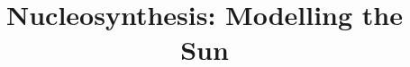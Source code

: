 \documentclass[conference]{IEEEtran}
\title{Nucleosynthesis: Modelling the Sun}
\author{
    \IEEEauthorblockN{Group 10}
    \IEEEauthorblockA{Board member: Dr. Joe Frost-Schenk}
}
\begin{document}
\maketitle

\begin{abstract}
    
\end{abstract}






% 


\appendix
\end{document}
